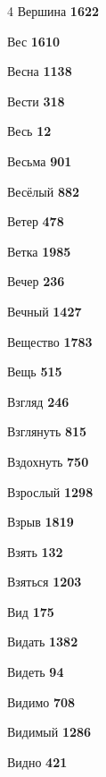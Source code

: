 \begin{multicols}{4}
\noindent Вершина \dotfill \textbf{\color{secondary} 1622}\par
\noindent Вес \dotfill \textbf{\color{secondary} 1610}\par
\noindent Весна \dotfill \textbf{\color{secondary} 1138}\par
\noindent Вести \dotfill \textbf{\color{secondary} 318}\par
\noindent Весь \dotfill \textbf{\color{secondary} 12}\par
\noindent Весьма \dotfill \textbf{\color{secondary} 901}\par
\noindent Весёлый \dotfill \textbf{\color{secondary} 882}\par
\noindent Ветер \dotfill \textbf{\color{secondary} 478}\par
\noindent Ветка \dotfill \textbf{\color{secondary} 1985}\par
\noindent Вечер \dotfill \textbf{\color{secondary} 236}\par
\noindent Вечный \dotfill \textbf{\color{secondary} 1427}\par
\noindent Вещество \dotfill \textbf{\color{secondary} 1783}\par
\noindent Вещь \dotfill \textbf{\color{secondary} 515}\par
\noindent Взгляд \dotfill \textbf{\color{secondary} 246}\par
\noindent Взглянуть \dotfill \textbf{\color{secondary} 815}\par
\noindent Вздохнуть \dotfill \textbf{\color{secondary} 750}\par
\noindent Взрослый \dotfill \textbf{\color{secondary} 1298}\par
\noindent Взрыв \dotfill \textbf{\color{secondary} 1819}\par
\noindent Взять \dotfill \textbf{\color{secondary} 132}\par
\noindent Взяться \dotfill \textbf{\color{secondary} 1203}\par
\noindent Вид \dotfill \textbf{\color{secondary} 175}\par
\noindent Видать \dotfill \textbf{\color{secondary} 1382}\par
\noindent Видеть \dotfill \textbf{\color{secondary} 94}\par
\noindent Видимо \dotfill \textbf{\color{secondary} 708}\par
\noindent Видимый \dotfill \textbf{\color{secondary} 1286}\par
\noindent Видно \dotfill \textbf{\color{secondary} 421}\par

\end{multicols}
